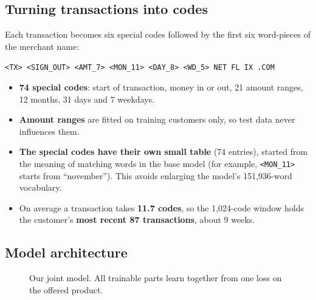 \documentclass[10pt,a4paper]{article}
\begin{document}
\subsection{Turning transactions into codes}
Each transaction becomes six special codes followed by the first six word-pieces of the merchant name:
\begin{center}
\texttt{<TX> <SIGN\_OUT> <AMT\_7> <MON\_11> <DAY\_8> <WD\_5> NET FL IX .COM}
\end{center}
\begin{itemize}
\item \textbf{74 special codes}: start of transaction, money in or out, 21 amount ranges, 12 months, 31 days and 7 weekdays.
\item \textbf{Amount ranges} are fitted on training customers only, so test data never influences them.
\item \textbf{The special codes have their own small table} (74 entries), started from the meaning of matching words in the base model (for example, \texttt{<MON\_11>} starts from ``november''). This avoids enlarging the model's 151,936-word vocabulary.
\item On average a transaction takes \textbf{11.7 codes}, so the 1,024-code window holds the customer's \textbf{most recent 87 transactions}, about 9 weeks.
\end{itemize}

\subsection{Model architecture}
\begin{figure}[!htb]
\centering
{}
\caption{Our joint model. All trainable parts learn together from one loss on the offered product.}
\end{figure}
\end{document}

